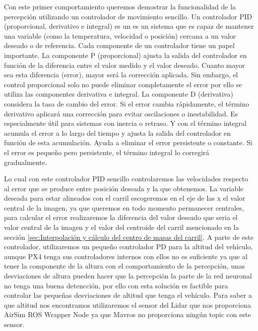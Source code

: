   Con este primer comportamiento queremos demostrar la funcionalidad de la percepción utilizando un controlador de movimiento sencillo. Un controlador PID (proporcional, derivativo e integral) es un 
  es un sistema que es capaz de mantener una variable (como la temperatura, velocidad o posición) cercana a un valor deseado o de referencia. Cada componente de un controlador tiene un papel 
  importante. \break
  La componente P (proporcional) ajusta la salida del controlador en función de la diferencia entre el valor medido y el valor deseado. 
  Cuanto mayor sea esta diferencia (error), mayor será la corrección aplicada. Sin embargo, el control proporcional solo no puede eliminar completamente el error por ello se utiliza
  las componentes derivativa e integral. La componente D (derivativa) considera la tasa de cambio del error. 
  Si el error cambia rápidamente, el término derivativo aplicará una corrección para evitar oscilaciones o inestabilidad. Es especialmente útil para sistemas con inercia o retraso.
  Y con el término integral acumula el error a lo largo del tiempo y ajusta la salida del controlador en función de esta acumulación. 
  Ayuda a eliminar el error persistente o constante. Si el error es pequeño pero persistente, el término integral lo corregirá gradualmente.
  \newline
 

  Lo cual con este controlador PID sencillo controlaremos las velocidades respecto al error que se produce entre posición deseada y la que obtenemos. La variable deseada para estar alineados con el carril escogeremos 
  en el eje de las x el valor central de la imagen, ya que queremos en todo momento permanecer centrales, para calcular el error realizaremos la diferencia del valor deseado que seria 
  el valor central de la imagen y el valor del centroide del carril mencionado en la sección \ref{sec:Interpolación y cálculo del centro de masas del carril}. 
  A parte de este controlador, utilizaremos un pequeño controlador PD para la altitud del vehículo, aunque PX4 tenga sus controladores internos con ellos no es suficiente ya que al tener
  la componente de la altura con el comportamiento de la percepción, unas desviaciones de altura pueden hacer que la percepción la parte de la red neuronal no tenga una buena detencción, 
  por ello con esta solución es factible para controlar las pequeñas desviaciones de altitud que tenga el vehículo. Para saber a que altitud nos encontramos utilizaremos el sensor del Lidar
  que nos proporciona AirSim ROS Wrapper Node ya que Mavros no proporciona ningún topic con este sensor.

